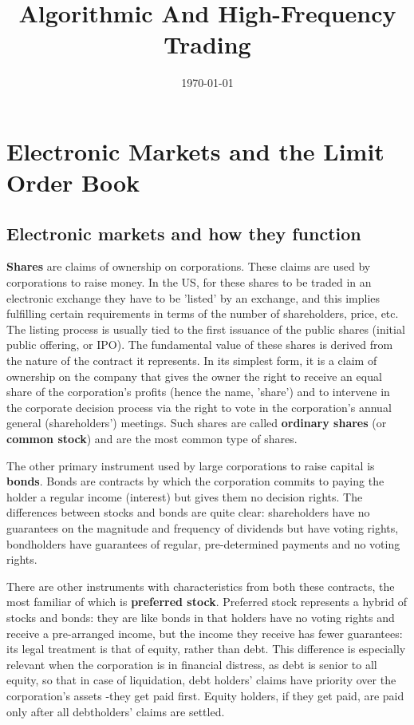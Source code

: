 \documentclass[11pt]{article}
\date{\today}
\title{Algorithmic And High-Frequency Trading}
\begin{document}
\maketitle
\tableofcontents

\section{Electronic Markets and the Limit Order Book}
\label{sec:org3b4b90c}
\subsection{Electronic markets and how they function}
\label{sec:org25c4cd7}
\textbf{Shares} are claims of ownership on corporations. These claims are used by corporations to raise money.
In the US, for these shares to be traded in an electronic exchange they have to be 'listed' by an
exchange, and this implies fulfilling certain requirements in terms of the number of shareholders,
price, etc. The listing process is usually tied to the first issuance of the public shares (initial
public offering, or IPO). The fundamental value of these shares is derived from the nature of the
contract it represents. In its simplest form, it is a claim of ownership on the company that gives the
owner the right to receive an equal share of the corporation's profits (hence the name, 'share') and
to intervene in the corporate decision process via the right to vote in the corporation's annual
general (shareholders') meetings. Such shares are called \textbf{ordinary shares} (or \textbf{common stock}) and are the
most common type of shares.

The other primary instrument used by large corporations to raise capital is \textbf{bonds}. Bonds are contracts
by which the corporation commits to paying the holder a regular income (interest) but gives them no
decision rights. The differences between stocks and bonds are quite clear: shareholders have no
guarantees on the magnitude and frequency of dividends but have voting rights, bondholders have
guarantees of regular, pre-determined payments and no voting rights.

There are other instruments with characteristics from both these contracts, the most familiar of which
is \textbf{preferred stock}. Preferred stock represents a hybrid of stocks and bonds: they are like bonds in
that holders have no voting rights and receive a pre-arranged income, but the income they receive has
fewer guarantees: its legal treatment is that of equity, rather than debt. This difference is
especially relevant when the corporation is in financial distress, as debt is senior to all equity, so
that in case of liquidation, debt holders' claims have priority over the corporation's assets -they
get paid first. Equity holders, if they get paid, are paid only after all debtholders' claims are
settled.
\end{document}

